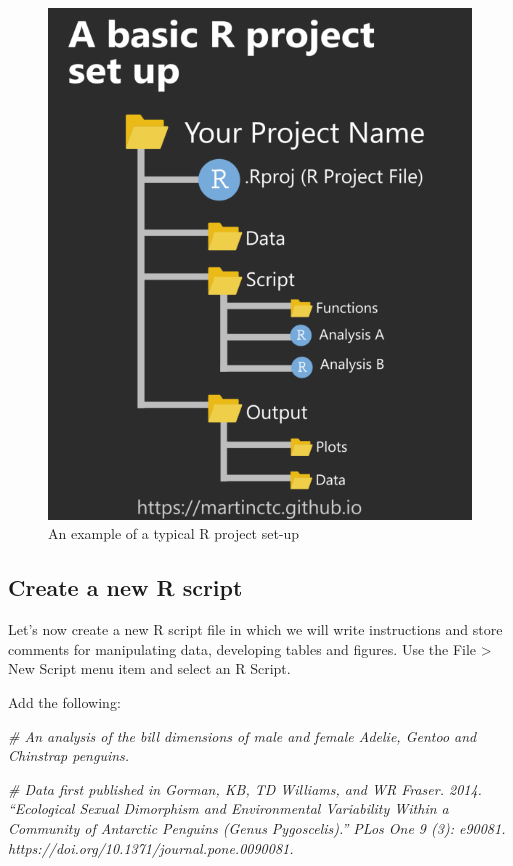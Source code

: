 \documentclass[
]{book}
\newenvironment{Shaded}{\begin{snugshade}}{\end{snugshade}}
\newcommand{\CommentTok}[1]{\textcolor[rgb]{0.56,0.35,0.01}{\textit{#1}}}
\begin{document}
\begin{figure}
\includegraphics[width=0.8\linewidth]{images/project} \caption{An example of a typical R project set-up}\label{fig:unnamed-chunk-48}
\end{figure}

\hypertarget{create-a-new-r-script}{%
\subsection{Create a new R script}\label{create-a-new-r-script}}

Let's now create a new R script file in which we will write instructions and store comments for manipulating data, developing tables and figures. Use the File \textgreater{} New Script menu item and select an R Script.

Add the following:

\begin{Shaded}
\begin{Highlighting}[]
\CommentTok{\# An analysis of the bill dimensions of male and female Adelie, Gentoo and Chinstrap penguins. }

\CommentTok{\# Data first published in  Gorman, KB, TD Williams, and WR Fraser. 2014. “Ecological Sexual Dimorphism and Environmental Variability Within a Community of Antarctic Penguins (Genus Pygoscelis).” PLos One 9 (3): e90081. https://doi.org/10.1371/journal.pone.0090081.}
\end{Highlighting}
\end{Shaded}
\end{document}
